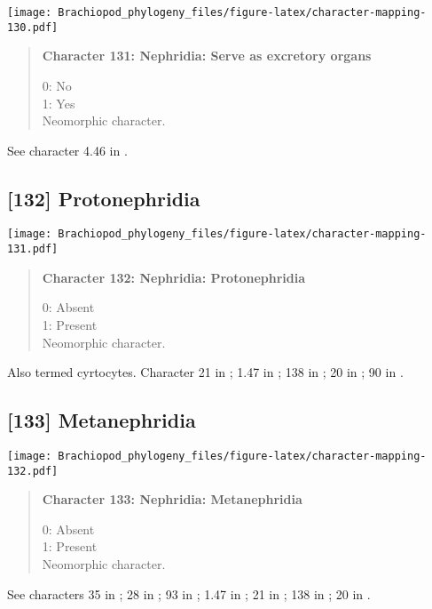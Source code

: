 \documentclass[openany]{book}
\theoremstyle{definition}
\theoremstyle{definition}
\theoremstyle{definition}
\theoremstyle{remark}
\begin{document}
\texttt{[image: Brachiopod\_phylogeny\_files/figure-latex/character-mapping-130.pdf]}

\begin{quote}
\textbf{Character 131: Nephridia: Serve as excretory organs}

0: No\\
1: Yes\\
Neomorphic character.
\end{quote}

See character 4.46 in \citet{SPS1996}.

\subsection*{{[}132{]} Protonephridia}\label{protonephridia}

\texttt{[image: Brachiopod\_phylogeny\_files/figure-latex/character-mapping-131.pdf]}

\begin{quote}
\textbf{Character 132: Nephridia: Protonephridia}

0: Absent\\
1: Present\\
Neomorphic character.
\end{quote}

Also termed cyrtocytes. Character 21 in \citet{Grobe2007}; 1.47 in
\citet{SPS1996}; 138 in \citet{Rouse1999}; 20 in \citet{Haszprunar1996};
90 in \citet{Glenner2004}.

\subsection*{{[}133{]} Metanephridia}\label{metanephridia}

\texttt{[image: Brachiopod\_phylogeny\_files/figure-latex/character-mapping-132.pdf]}

\begin{quote}
\textbf{Character 133: Nephridia: Metanephridia}

0: Absent\\
1: Present\\
Neomorphic character.
\end{quote}

See characters 35 in \citet{Rouse1999}; 28 in \citet{Haszprunar2000}; 93
in \citet{Glenner2004}; 1.47 in \citet{SPS1996}; 21 in
\citet{Grobe2007}; 138 in \citet{Rouse1999}; 20 in
\citet{Haszprunar1996}.
\end{document}
